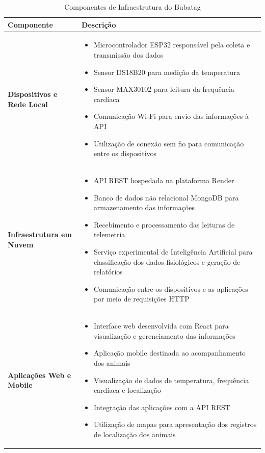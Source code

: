 \documentclass[11pt,a4paper]{article}
\begin{document}
\begin{table}[H]
\centering
\caption{Componentes de Infraestrutura do Bubatag}
\label{tab:infrastructure}
\begin{tabular}{|l|p{10cm}|}
\hline
\textbf{Componente} & \textbf{Descrição} \\
\hline

\textbf{Dispositivos e Rede Local} &
\begin{itemize}[leftmargin=*, nosep]
    \item Microcontrolador ESP32 responsável pela coleta e transmissão dos dados
    \item Sensor DS18B20 para medição da temperatura
    \item Sensor MAX30102 para leitura da frequência cardíaca
    \item Comunicação Wi-Fi para envio das informações à API
    \item Utilização de conexão sem fio para comunicação entre os dispositivos
\end{itemize} \\
\hline

\textbf{Infraestrutura em Nuvem} &
\begin{itemize}[leftmargin=*, nosep]
    \item API REST hospedada na plataforma Render
    \item Banco de dados não relacional MongoDB para armazenamento das informações
    \item Recebimento e processamento das leituras de telemetria
    \item Serviço experimental de Inteligência Artificial para classificação dos dados fisiológicos e geração de relatórios
    \item Comunicação entre os dispositivos e as aplicações por meio de requisições HTTP
\end{itemize} \\
\hline

\textbf{Aplicações Web e Mobile} &
\begin{itemize}[leftmargin=*, nosep]
    \item Interface web desenvolvida com React para visualização e gerenciamento das informações
    \item Aplicação mobile destinada ao acompanhamento dos animais
    \item Visualização de dados de temperatura, frequência cardíaca e localização
    \item Integração das aplicações com a API REST
    \item Utilização de mapas para apresentação dos registros de localização dos animais
\end{itemize} \\
\hline


\end{tabular}
\end{table}
\end{document}
